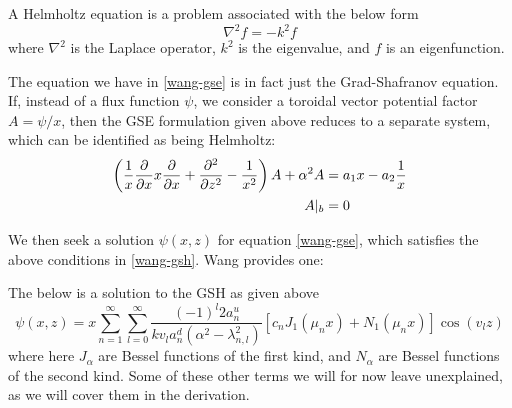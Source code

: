 \begin{definition}
    A Helmholtz equation is a problem associated with the below form
    $$\nabla^2 f = -k^2 f$$
    where $\nabla^2$ is the Laplace operator, $k^2$ is the eigenvalue, and $f$ is an eigenfunction.
\end{definition}
The equation we have in \ref{wang-gse} is in fact just the Grad-Shafranov equation. If, instead of a flux function $\psi$, we consider 
a toroidal vector potential factor $A = \psi / x$, then the GSE formulation given above reduces to a separate system, which can be identified 
as being Helmholtz:
\begin{align}
    \label{wang-gsh} \left ( \frac{1}{x} \pdv{x} x \pdv{x} + \pdv[2]{z} - \frac{1}{x^2} \right ) A + \alpha^2 A &= a_1 x - a_2 \frac{1}{x} \\
    A |_b &= 0
\end{align}

We then seek a solution $\psi(x,z)$ for equation \ref{wang-gse}, which satisfies the above conditions in \ref{wang-gsh}. Wang provides one:
\begin{proposition}
    The below is a solution to the GSH as given above
    \begin{equation}
        \label{gsh-solution} \psi(x,z) = x \sum_{n = 1}^{\infty} \sum_{l = 0}^{\infty} \frac{(-1)^l 2 a_n^u}{kv_la_n^d (\alpha^2 - \lambda_{n,l}^2)} \left [ c_n J_1(\mu_n x) + N_1(\mu_n x)\right ] \cos(v_l z)
    \end{equation}
    where here $J_\alpha$ are Bessel functions of the first kind, and $N_\alpha$ are Bessel functions of the second kind. Some of these other terms we will for now 
    leave unexplained, as we will cover them in the derivation. 
\end{proposition}

